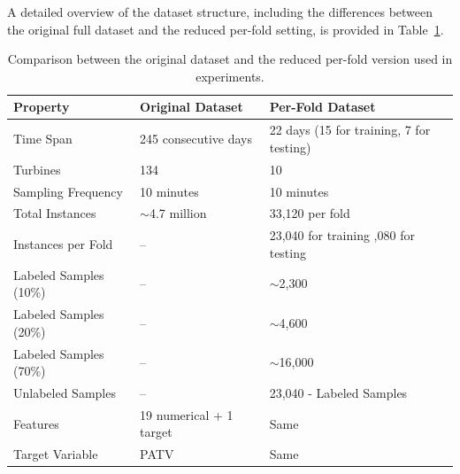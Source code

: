 A detailed overview of the dataset structure, including the differences between the original full dataset and the reduced per-fold setting, is provided in Table~\ref{tab:dataset-comparison}.


\begin{table}[ht]
\centering
\caption{Comparison between the original dataset and the reduced per-fold version used in experiments.}
\label{tab:dataset-comparison}
\renewcommand{\arraystretch}{1.2}
\begin{tabularx}{\textwidth}{l X X}
\toprule
\textbf{Property} & \textbf{Original Dataset} & \textbf{Per-Fold Dataset} \\
\midrule
Time Span & 245 consecutive days & 22 days (15 for training, 7 for testing) \\
Turbines & 134 & 10 \\
Sampling Frequency & 10 minutes & 10 minutes \\
Total Instances & $\sim$4.7 million & 33,120 per fold \\
Instances per Fold & -- & 23,040 for training \newline 10,080 for testing \\
Labeled Samples (10\%) & -- & $\sim$2,300 \\
Labeled Samples (20\%) & -- & $\sim$4,600 \\
Labeled Samples (70\%) & -- & $\sim$16,000 \\
Unlabeled Samples & -- & 23,040 - Labeled Samples \\
Features & 19 numerical + 1 target & Same \\
Target Variable & PATV & Same \\
\bottomrule
\end{tabularx}
\end{table}

